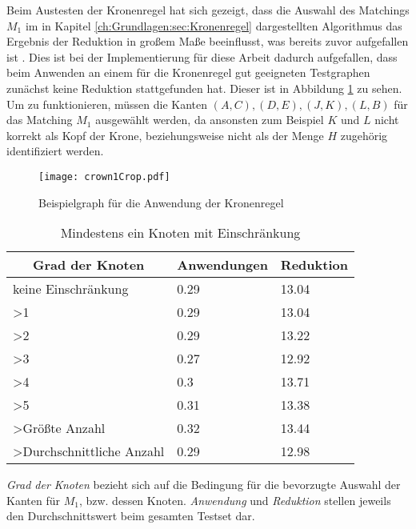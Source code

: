 Beim Austesten der Kronenregel hat sich gezeigt, dass die Auswahl des Matchings $M_{1}$ im in Kapitel \ref{ch:Grundlagen:sec:Kronenregel} dargestellten Algorithmus das Ergebnis der Reduktion in großem Maße beeinflusst, was bereits zuvor aufgefallen ist \cite{paper:7}. Dies ist bei der Implementierung für diese Arbeit dadurch aufgefallen, dass beim Anwenden an einem für die Kronenregel gut geeigneten Testgraphen zunächst keine Reduktion stattgefunden hat. Dieser ist in Abbildung \ref{fig:crown1} zu sehen. Um zu funktionieren, müssen die Kanten $(A,C), (D,E), (J,K), (L,B)$ für das Matching $M_{1}$ ausgewählt werden, da ansonsten zum Beispiel $K$ und $L$ nicht korrekt als Kopf der Krone, beziehungsweise nicht als der Menge $H$ zugehörig identifiziert werden.
\begin{figure}[htb]
\centering
  	{\texttt{[image: crown1Crop.pdf]}}
	\caption{Beispielgraph für die Anwendung der Kronenregel\label{fig:crown1}}
\centering
\end{figure}
\begin{table}[htb]
\caption{Mindestens ein Knoten mit Einschränkung\label{tab:degreeOR}}
\vspace*{1em}
\centering

\bgroup
\def\arraystretch{1.3}%

\begin{threeparttable}

\begin{tabular}[c]{lll}
	\hline
	\multicolumn{1}{c}{\textbf{Grad der Knoten}} & 
	\multicolumn{1}{c}{\textbf{Anwendungen}} & 
	\multicolumn{1}{c}{\textbf{Reduktion}} \\ 
	
	\hline

	keine Einschränkung&0.29&13.04\\
	>1&0.29 &13.04 \\
	>2&0.29 &13.22 \\
	>3& 0.27& 12.92 \\
	>4& 0.3& 13.71 \\
	>5& 0.31&13.38 \\
	>Größte Anzahl& 0.32&13.44 \\
	>Durchschnittliche Anzahl& 0.29&12.98 \\
	\hline
\end{tabular}
\begin{tablenotes}\footnotesize
\item \emph{Grad der Knoten} bezieht sich auf die Bedingung für die bevorzugte Auswahl der Kanten für $M_{1}$, bzw. dessen Knoten. \emph{Anwendung} und \emph{Reduktion} stellen jeweils den Durchschnittswert beim gesamten Testset dar.
\end{tablenotes}

\end{threeparttable}

\egroup

\end{table}


